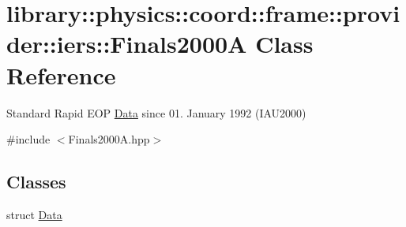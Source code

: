 \hypertarget{classlibrary_1_1physics_1_1coord_1_1frame_1_1provider_1_1iers_1_1_finals2000_a}{}\section{library\+:\+:physics\+:\+:coord\+:\+:frame\+:\+:provider\+:\+:iers\+:\+:Finals2000A Class Reference}
\label{classlibrary_1_1physics_1_1coord_1_1frame_1_1provider_1_1iers_1_1_finals2000_a}


Standard Rapid E\+OP \hyperlink{structlibrary_1_1physics_1_1coord_1_1frame_1_1provider_1_1iers_1_1_finals2000_a_1_1_data}{Data} since 01. January 1992 (I\+A\+U2000)  




{\ttfamily \#include $<$Finals2000\+A.\+hpp$>$}

\subsection*{Classes}
\begin{DoxyCompactItemize}
\item 
struct \hyperlink{structlibrary_1_1physics_1_1coord_1_1frame_1_1provider_1_1iers_1_1_finals2000_a_1_1_data}{Data}
\end{DoxyCompactItemize}
